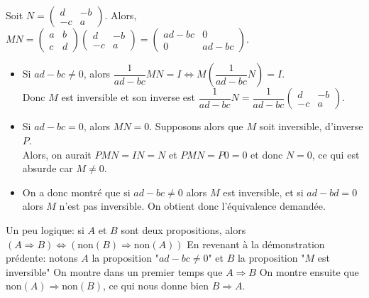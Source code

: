 \documentclass{cornouaille}
\begin{document}
\begin{preuve}\setlength{\arraycolsep}{3.5pt}
Soit $N=\begin{pmatrix}
 d & -b \\
-c & a
\end{pmatrix}$. Alors,
$MN=\begin{pmatrix}
 a & b \\
c & d
\end{pmatrix}
\begin{pmatrix}
 d & -b \\
-c & a
\end{pmatrix}=
\begin{pmatrix}
 ad-bc & 0 \\
0 & ad-bc
\end{pmatrix}
$.
\begin{itemize}
\item Si $ad-bc\neq0$, alors $\dfrac{1}{ad-bc}MN=I\Leftrightarrow M\left(\dfrac{1}{ad-bc}N\right)=I$.\\
Donc $M$ est inversible et son inverse est $\dfrac{1}{ad-bc}N=\dfrac{1}{ad-bc}
\begin{pmatrix}
 d & -b \\
-c & a
\end{pmatrix}$.
\item Si $ad-bc=0$, alors $MN=0$. Supposons alors que $M$ soit inversible, d'inverse $P$.\\
    Alors, on aurait $PMN=IN=N$ et  $PMN=P0=0$ et donc $N=0$, ce qui est absurde car $M \neq 0$.
\item On a donc montré que si $ad-bc \neq 0$ alors $M$ est inversible, et si $ad-bd=0$ alors $M$ n'est pas inversible. On obtient donc l'équivalence demandée.
\end{itemize}
\end{preuve}

\begin{remarque}
Un peu logique: si $A$  et $B$ sont deux propositions, alors $(A \Rightarrow B) \iff (\text{non}(B) \Rightarrow \text{non}(A))$\newline
En revenant à la démonstration prédente: notons $A$ la proposition "$ad-bc \neq 0$" et $B$ la proposition "$M$ est inversible"\newline
On montre dans un premier temps que $A \Rightarrow B$\newline
On montre ensuite que $\text{non}(A) \Rightarrow \text{non}(B)$, ce qui nous donne bien $B \Rightarrow A$.
\end{remarque}
\end{document}
